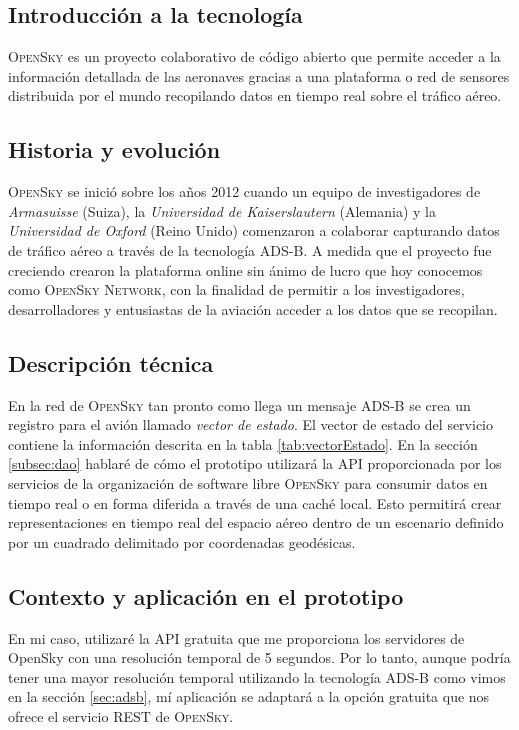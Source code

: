 \documentclass[a4paper, 11pt]{book}
\begin{document}
\subsection{Introducción a la tecnología}
\textsc{OpenSky} es un proyecto colaborativo de código abierto que permite acceder a la información detallada de las aeronaves gracias a una plataforma o red de sensores distribuida por el mundo recopilando datos en tiempo real sobre el tráfico aéreo.
\subsection{Historia y evolución}
\textsc{OpenSky} se inició sobre los años 2012 cuando un equipo de investigadores de \emph{Armasuisse} (Suiza), la \emph{Universidad de Kaiserslautern} (Alemania) y la \emph{Universidad de Oxford} (Reino Unido) comenzaron a colaborar capturando datos de tráfico aéreo a través de la tecnología \textsc{ADS-B}.
A medida que el proyecto fue creciendo crearon la plataforma online sin ánimo de lucro que hoy conocemos como \textsc{OpenSky Network}, con la finalidad de permitir a los investigadores, desarrolladores y entusiastas de la aviación acceder a los datos que se recopilan.
\subsection{Descripción técnica}
En la red de \textsc{OpenSky} tan pronto como llega un mensaje \textsc{ADS-B} se crea un registro para el avión llamado \emph{vector de estado}.
El vector de estado del servicio contiene la información descrita en la tabla \ref{tab:vectorEstado}.
En la sección \ref{subsec:dao} hablaré de cómo el prototipo utilizará la \textsc{\gls{API}} proporcionada por los servicios de la organización de software libre \textsc{OpenSky} para consumir datos en tiempo real o en forma diferida a través de una caché local. Esto permitirá crear representaciones en tiempo real del espacio aéreo dentro de un escenario definido por un cuadrado delimitado por coordenadas geodésicas.

\subsection{Contexto y aplicación en el prototipo}
En mi caso, utilizaré la \textsc{API} gratuita que me proporciona los servidores de OpenSky con una resolución temporal de 5 segundos. Por lo tanto, aunque podría tener una mayor resolución temporal utilizando la tecnología \textsc{ADS-B} como vimos en la sección \ref{sec:adsb}, mí aplicación se adaptará a la opción gratuita que nos ofrece el servicio \textsc{REST} de \textsc{OpenSky}.
\end{document}
